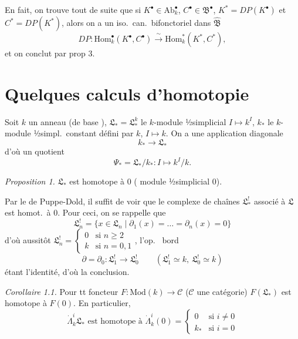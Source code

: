 \documentclass[11pt,a4paper]{article}
\begin{document}
En fait, on trouve tout de suite que si
$K^\bullet \in \mathrm{Ab}_k^\bullet$, $C^\bullet \in \mathfrak{B}^\bullet$, $K^* = DP(K^\bullet)$ et $C^* = DP(K^*)$,
alors on a un iso.\ can.\ bifonctoriel dans $\widehat{\mathfrak{B}}$
\[ DP : \mathrm{Hom}^\bullet_k(K^\bullet, C^\bullet) \xrightarrow{\ \sim\ } \mathrm{Hom}^*_k(K^*, C^*), \]
et on conclut par prop 3.


\section{Quelques calculs d'homotopie}

Soit $k$ un anneau (de base ),
$\mathfrak{L}_* = \mathfrak{L}^k_*$ le $k$-module ½simplicial $I \mapsto k^I$,
$k_*$ le $k$-module ½simpl.\ constant défini par $k$, $I \mapsto k$.
On a une application diagonale
\[ k_* \to \mathfrak{L}_* \]
d'où un quotient
\[ \Psi_* = \mathfrak{L}_*/k_* : I \mapsto k^I/k . \]

\emph{Proposition 1.} $\mathfrak{L}_*$ est homotope à $0$ \struck{\ill{}} ( module ½simplicial $0$).

Par le  de Puppe-Dold, il suffit de voir que
le complexe de chaînes $\mathfrak{L}^!_*$ associé à $\mathfrak{L}$ est homot.\ à
$0$. Pour ceci, on se rappelle que
\[ \mathfrak{L}^!_n = \{ x \in \mathfrak{L}_n \mid \partial_1(x) = \dots = \partial_n(x) = 0 \} \]
d'où aussitôt
$\mathfrak{L}^!_n = \begin{cases} 0 & \text{si } n \geq 2 \\ k & \text{si } n = 0, 1 \end{cases}$,
l'op.\ \struck{\ill{}} bord
\[ \partial = \partial_0 : \mathfrak{L}^!_1 \to \mathfrak{L}^!_0 \qquad (\mathfrak{L}^!_1 \simeq k,\ \mathfrak{L}^!_0 \simeq k) \]
étant l'identité, d'où la conclusion.

\emph{Corollaire 1.1.} Pour tt foncteur $F : \mathrm{Mod}(k) \to \mathcal{C}$
($\mathcal{C}$ une catégorie) $F(\mathfrak{L}_*)$ est homotope à $F(0)$.
En particulier, 
\[ \dot\Lambda^i_k\mathfrak{L}_* \text{ est homotope à } \dot\Lambda^i_k(0) = \begin{cases} 0 & \text{si } i \neq 0 \\ k_* & \text{si } i = 0 \end{cases} \]
\end{document}
